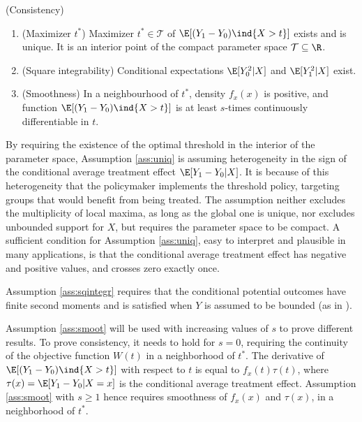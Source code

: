 {\begin{ass} \label{ass:consistency}
{\normalfont (Consistency)} 
\begin{enumerate}[label=2.\arabic*]
\item \label{ass:uniq}
    {\normalfont (Maximizer $t^*$)} Maximizer $t^* \in \mathcal{T} $ of $\E[(Y_1-Y_0) \ind\{X> t\}]$ exists and is unique. It is an interior point of the compact parameter space $\mathcal{T} \subseteq \R$.
\item \label{ass:sqintegr}
    {\normalfont (Square integrability)} Conditional expectations $\E[Y_0^2|X]$ and $\E[Y_1^2|X]$ exist.
\item \label{ass:smoot}
    {\normalfont (Smoothness)} In a neighbourhood of $t^*$, density $f_x(x)$ is positive, and function $\E[(Y_1-Y_0) \ind\{X> t\}]$ is at least $s$-times continuously differentiable in $t$.
\end{enumerate}
\end{ass}

By requiring the existence of the optimal threshold in the interior of the parameter space, Assumption \ref{ass:uniq} is assuming heterogeneity in the sign of the conditional average treatment effect $\E[Y_1 - Y_0 | X]$. It is because of this heterogeneity that the policymaker implements the threshold policy, targeting groups that would benefit from being treated. The assumption neither excludes the multiplicity of local maxima, as long as the global one is unique, nor excludes unbounded support for $X$, but requires the parameter space to be compact. A sufficient condition for Assumption \ref{ass:uniq}, easy to interpret and plausible in many applications, is that the conditional average treatment effect has negative and positive values, and crosses zero exactly once.

Assumption \ref{ass:sqintegr} requires that the conditional potential outcomes have finite second moments and is satisfied when $Y$ is assumed to be bounded (as in \cite{kitagawa2018should}).

Assumption \ref{ass:smoot} will be used with increasing values of $s$ to prove different results. To prove consistency, it needs to hold for $s=0$, requiring the continuity of the objective function $W(t)$ in a neighborhood of $t^*$. The derivative of $\E[(Y_1-Y_0) \ind\{X> t\}]$ with respect to $t$ is equal to $f_x(t) \tau(t)$, where $\tau(x) = \E[Y_1-Y_0 | X=x]$ is the conditional average treatment effect. Assumption \ref{ass:smoot} with $s \geq 1$ hence requires smoothness of $f_x(x)$ and $\tau(x)$, in a neighborhood of $t^*$.

}
